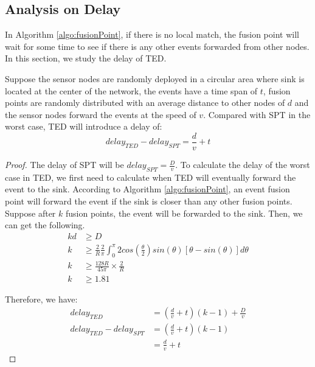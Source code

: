 \subsection{Analysis on Delay}
In Algorithm \ref{algo:fusionPoint}, if there is no local match, the fusion point will wait for some time to see if there is any other events forwarded from other nodes. In this section, we study the delay of TED.
\begin{theorem}
\label{thm:delay}
Suppose the sensor nodes are randomly deployed in a circular area where sink is located at the center of the network, the events have a time span of \(t\), fusion points are randomly distributed with an average distance to other nodes of \(d\) and the sensor nodes forward the events at the speed of \(v\). Compared with SPT in the worst case, TED will introduce a delay of:
\begin{equation*}
delay_{TED}-delay_{SPT}=\frac{d}{v}+t
\end{equation*}
\end{theorem}

\begin{proof}
The delay of SPT will be \(delay_{SPT}=\frac{D}{v}\). To calculate the delay of the worst case in TED, we first need to calculate when TED will eventually forward the event to the sink. According to Algorithm \ref{algo:fusionPoint}, an event fusion point will forward the event if the sink is closer than any other fusion points. Suppose after \(k\) fusion points, the event will be forwarded to the sink. Then, we can get the following.
\begin{align*}
kd&\geq D\\
k&\geq \frac{2}{R}\frac{2}{\pi}\int_0^{\pi}2cos(\frac{\theta}{2})sin(\theta)[\theta-sin(\theta)]d\theta\\
k&\geq \frac{128R}{45\pi}\times\frac{2}{R}\\
k&\geq 1.81
\end{align*}

Therefore, we have:
\begin{align*}
delay_{TED}&=(\frac{d}{v}+t)(k-1)+\frac{D}{v}\\
delay_{TED}-delay_{SPT}&=(\frac{d}{v}+t)(k-1)\\
&=\frac{d}{v}+t
\end{align*}
\end{proof}